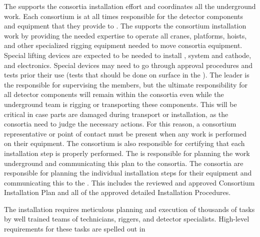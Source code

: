 The  supports the consortia installation effort and coordinates all the  underground work.
Each consortium is at all times responsible for the detector components and equipment that they provide to .
The  supports the consortium installation work by providing the needed expertise to operate all cranes, platforms, hoists, and other specialized rigging equipment needed to move consortia equipment.
Special lifting devices are expected to be needed to install ,  system  and cathode, and electronics.
Special devices may need to go through approval procedures and tests prior their use (tests that should be done on surface in the ).
The  leader is the responsible for supervising the  members, but the ultimate responsibility for all detector components will remain within the consortia even while the underground team is rigging or transporting these components.
This will be critical in case parts are damaged during transport or installation, as the consortia need to judge the necessary actions.
For this reason, a consortium representative or point of contact must be present when any work is performed on their equipment.
The consortium is also responsible for certifying that each installation step is properly performed.
The  is responsible for planning the work underground and communicating this plan to the consortia.
The consortia are responsible for planning the individual installation steps for their equipment and communicating this to the .
This includes the reviewed and approved Consortium Installation Plan and all of the approved detailed Installation Procedures.



The installation requires meticulous planning and execution of thousands of tasks by well trained
 teams of technicians, riggers, and detector specialists. High-level requirements for these tasks are spelled out in %










